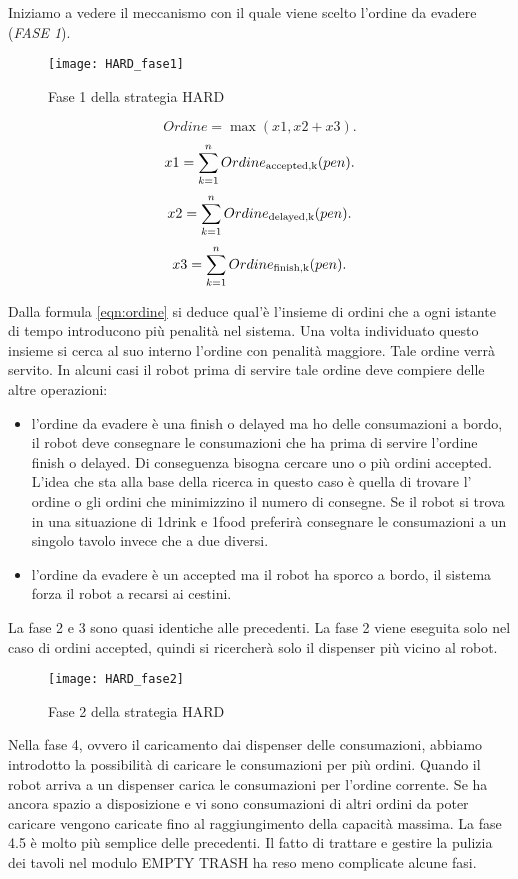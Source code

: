Iniziamo a vedere il meccanismo con il quale viene scelto l'ordine da evadere (\emph{FASE 1}).

\begin{figure}[htp]
  \texttt{[image: HARD\_fase1]}
  \caption{Fase 1 della strategia HARD}
  \label{fig:figure7}
\end{figure}

\begin{equation}
\label{eqn:ordine}
Ordine=\max(x1,x2+x3).
\end{equation}
\[
x1=\sum_{k=1}^n Ordine_\textup{accepted,k}(pen).
\]\[
x2=\sum_{k=1}^n Ordine_\textup{delayed,k}(pen).
\]\[
x3=\sum_{k=1}^n Ordine_\textup{finish,k}(pen).
\]

Dalla formula \eqref{eqn:ordine} si deduce qual'è l'insieme di ordini che a ogni istante di tempo introducono più penalità nel sistema. Una volta individuato questo insieme si cerca al suo interno l'ordine con penalità maggiore. Tale ordine verrà servito.
In alcuni casi il robot prima di servire tale ordine deve compiere delle altre operazioni:
\begin{itemize}
  \item l'ordine da evadere è una finish o delayed ma ho delle consumazioni a bordo, il robot deve consegnare le consumazioni che ha prima di servire l'ordine finish o delayed. Di conseguenza bisogna cercare uno o più ordini accepted. L'idea che sta alla base della ricerca in questo caso è quella di trovare l' ordine o gli ordini che minimizzino il numero di consegne. Se il robot si trova in una situazione di 1drink e 1food preferirà consegnare le consumazioni a un singolo tavolo invece che a due diversi.
  \item l'ordine da evadere è un accepted ma il robot ha sporco a bordo, il sistema forza il robot a recarsi ai cestini.
\end{itemize}

La fase 2 e 3 sono quasi identiche alle precedenti. La fase 2 viene eseguita solo nel caso di ordini accepted, quindi si ricercherà solo il dispenser più vicino al robot.

\begin{figure}[h!tp]
  \texttt{[image: HARD\_fase2]}
  \caption{Fase 2 della strategia HARD}
  \label{fig:figure8}
\end{figure}

Nella fase 4, ovvero il caricamento dai dispenser delle consumazioni, abbiamo introdotto la possibilità di caricare le consumazioni per più ordini. Quando il robot arriva a un dispenser carica le consumazioni per l'ordine corrente. Se ha ancora spazio a disposizione e vi sono consumazioni di altri ordini da poter caricare vengono caricate fino al raggiungimento della capacità massima.
La fase 4.5 è molto più semplice delle precedenti. Il fatto di trattare e gestire la pulizia dei tavoli nel modulo EMPTY TRASH ha reso meno complicate alcune fasi.

